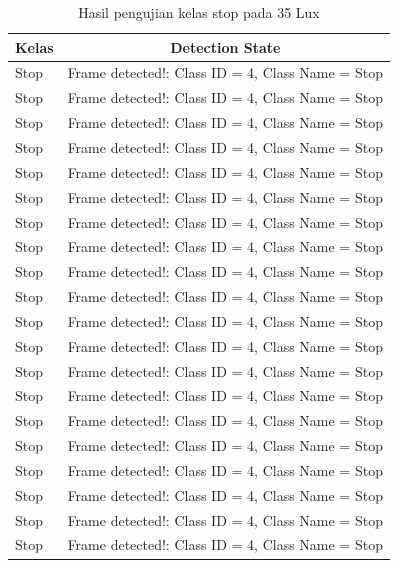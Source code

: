 \begin{longtable}{|l|c|}
  \caption{Hasil pengujian kelas stop pada 35 Lux}
  \label{tb:luxstop} \\
  \hline
  \rowcolor[HTML]{C0C0C0} 
  \textbf{Kelas} & \textbf{Detection State}                           \\ \hline
  Stop           & Frame detected!: Class ID = 4, Class Name = Stop \\ \hline
  Stop           & Frame detected!: Class ID = 4, Class Name = Stop \\ \hline
  Stop           & Frame detected!: Class ID = 4, Class Name = Stop \\ \hline
  Stop           & Frame detected!: Class ID = 4, Class Name = Stop \\ \hline
  Stop           & Frame detected!: Class ID = 4, Class Name = Stop \\ \hline
  Stop           & Frame detected!: Class ID = 4, Class Name = Stop \\ \hline
  Stop           & Frame detected!: Class ID = 4, Class Name = Stop \\ \hline
  Stop           & Frame detected!: Class ID = 4, Class Name = Stop \\ \hline
  Stop           & Frame detected!: Class ID = 4, Class Name = Stop \\ \hline
  Stop           & Frame detected!: Class ID = 4, Class Name = Stop \\ \hline
  Stop           & Frame detected!: Class ID = 4, Class Name = Stop \\ \hline
  Stop           & Frame detected!: Class ID = 4, Class Name = Stop \\ \hline
  Stop           & Frame detected!: Class ID = 4, Class Name = Stop \\ \hline
  Stop           & Frame detected!: Class ID = 4, Class Name = Stop \\ \hline
  Stop           & Frame detected!: Class ID = 4, Class Name = Stop \\ \hline
  Stop           & Frame detected!: Class ID = 4, Class Name = Stop \\ \hline
  Stop           & Frame detected!: Class ID = 4, Class Name = Stop \\ \hline
  Stop           & Frame detected!: Class ID = 4, Class Name = Stop \\ \hline
  Stop           & Frame detected!: Class ID = 4, Class Name = Stop \\ \hline
  Stop           & Frame detected!: Class ID = 4, Class Name = Stop \\ \hline

\end{longtable}
